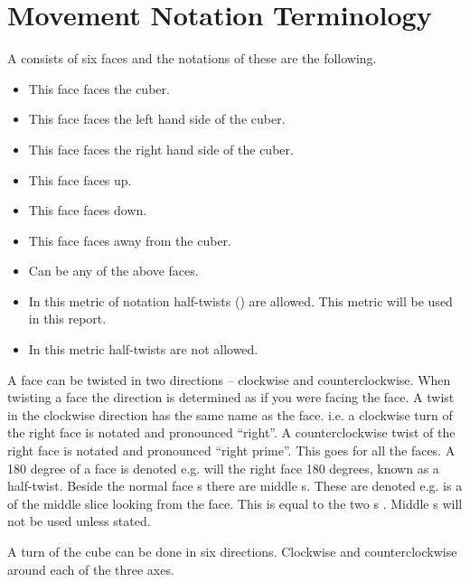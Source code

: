 \section{Movement Notation Terminology}
\label{sec:moveNotation}
A \cube{} consists of six faces and the notations of these are the following.
\begin{itemize}
\item {}This face faces the cuber.
\item {}This face faces the left hand side of the cuber.
\item {}This face faces the right hand side of the cuber.
\item {}This face faces up.
\item {}This face faces down.
\item {}This face faces away from the cuber.
\item {}Can be any of the above faces.
\item {}In this metric of notation half-twists () are allowed. This metric will be used in this report.
\item {}In this metric half-twists are not allowed.
\end{itemize} 

A face can be twisted in two directions -- clockwise and counterclockwise. When twisting a face the direction is determined as if you were facing the face.
A twist in the clockwise direction has the same name as the face. i.e. a clockwise turn of the right face is notated  and pronounced ``right''.
A counterclockwise twist of the right face is notated  and pronounced ``right prime''. This goes for all the faces.
A 180 degree \twist{} of a face is denoted  e.g.  will \twist{} the right face 180 degrees, known as a half-twist.  
Beside the normal face \twist{}s there are middle \twist{}s. These are denoted  e.g.  is a \twist{} of the middle slice looking from the  face. This \twist{} is equal to the two \twist{}s . Middle \twist{}s will not be used unless stated.   

A turn of the cube can be done in six directions. Clockwise and counterclockwise around each of the three axes.

